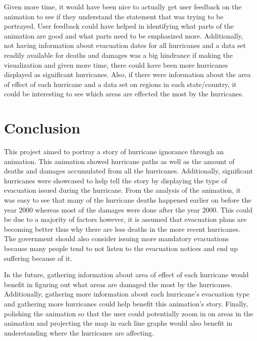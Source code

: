 Given more time, it would have been nice to actually get user feedback on the animation to see if they understand the statement that was trying to be portrayed. User feedback could have helped in identifying what parts of the animation are good and what parts need to be emphasized more. Additionally, not having information about evacuation dates for all hurricanes and a data set readily available for deaths and damages was a big hindrance if making the visualization and given more time, there could have been more hurricanes displayed as significant hurricanes. Also, if there were information about the area of effect of each hurricane and a data set on regions in each state/country, it could be interesting to see which areas are effected the most by the hurricanes. 

\section{Conclusion}
\label{sec:conclusion}

This project aimed to portray a story of hurricane ignorance through an animation. This animation showed hurricane paths as well as the amount of deaths and damages accumulated from all the hurricanes. Additionally, significant hurricanes were showcased to help tell the story by displaying the type of evacuation issued during the hurricane. From the analysis of the animation, it was easy to see that many of the hurricane deaths happened earlier on before the year 2000 whereas most of the damages were done after the year 2000. This could be due to a majority of factors however, it is assumed that evacuation plans are becoming better thus why there are less deaths in the more recent hurricanes. The government should also consider issuing more mandatory evacuations because many people tend to not listen to the evacuation notices and end up suffering because of it.

In the future, gathering information about area of effect of each hurricane would benefit in figuring out what areas are damaged the most by the hurricanes. Additionally, gathering more information about each hurricane's evacuation type and gathering more hurricanes could help benefit this animation's story. Finally, polishing the animation so that the user could potentially zoom in on areas in the animation and projecting the map in each line graphs would also benefit in understanding where the hurricanes are affecting.